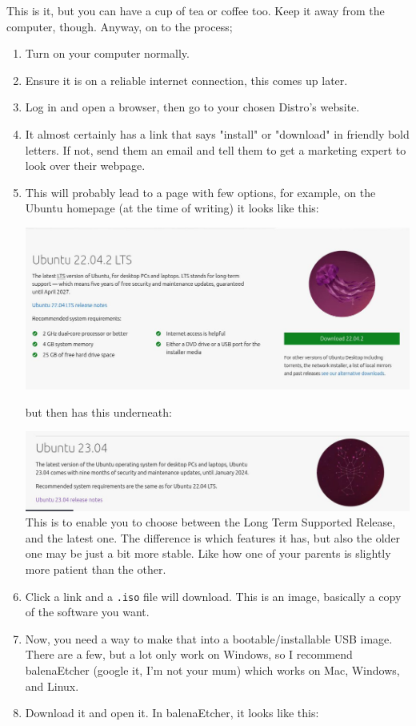 \documentclass{book}
\begin{document}
This is it, but you can have a cup of tea or coffee too. Keep it away from the computer, though. Anyway, on to the process;


\begin{enumerate}
    \item Turn on your computer normally.
    \item Ensure it is on a reliable internet connection, this comes up later.
    \item Log in and open a browser, then go to your chosen Distro's website. 
    \item It almost certainly has a link that says "install" or "download" in friendly bold letters. If not, send them an email and tell them to get a marketing expert to look over their webpage.
    \item This will probably lead to a page with  few options, for example, on the Ubuntu homepage (at the time of writing) it looks like this:
    
    \includegraphics[scale=0.3]{2204.jpg}

    but then has this underneath:

    \includegraphics[scale=0.31]{2304.jpg}
    This is to enable you to choose between the Long Term Supported Release, and the latest one. The difference is which features it has, but also the older one may be just a bit more stable. Like how one of your parents is slightly more patient than the other.

    \item Click a link and a \verb|.iso| file will download. This is an image, basically a copy of the software you want. 
    \item Now, you need a way to make that into a bootable/installable USB image. There are a few, but a lot only work on Windows, so I recommend balenaEtcher (google it, I'm not your mum) which works on Mac, Windows, and Linux. 
    \item Download it and open it. In balenaEtcher, it looks like this:


\end{enumerate}
\end{document}
